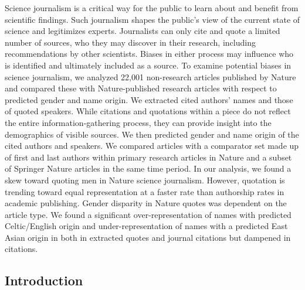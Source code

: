 Science journalism is a critical way for the public to learn about and benefit from scientific findings.
Such journalism shapes the public's view of the current state of science and legitimizes experts.
Journalists can only cite and quote a limited number of sources, who they may discover in their research, including recommendations by other scientists.
Biases in either process may influence who is identified and ultimately included as a source.
To examine potential biases in science journalism, we analyzed 22,001 non-research articles published by Nature and compared these with Nature-published research articles with respect to predicted gender and name origin.
We extracted cited authors' names and those of quoted speakers.
While citations and quotations within a piece do not reflect the entire information-gathering process, they can provide insight into the demographics of visible sources.
We then predicted gender and name origin of the cited authors and speakers.
We compared articles with a comparator set made up of first and last authors within primary research articles in Nature and a subset of Springer Nature articles in the same time period.
In our analysis, we found a skew toward quoting men in Nature science journalism.
However, quotation is trending toward equal representation at a faster rate than authorship rates in academic publishing.
Gender disparity in Nature quotes was dependent on the article type.
We found a significant over-representation of names with predicted Celtic/English origin and under-representation of names with a predicted East Asian origin in both in extracted quotes and journal citations but dampened in citations.

\hypertarget{introduction}{%
\subsection{Introduction}\label{introduction}}

